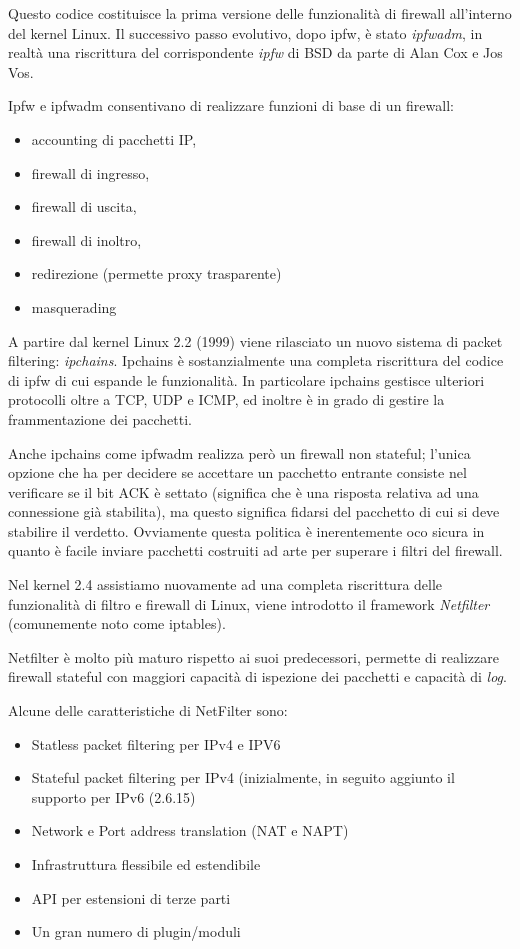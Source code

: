 Questo codice costituisce la prima versione delle funzionalità di firewall
all'interno del kernel Linux. Il successivo passo evolutivo, dopo ipfw, è
stato {\em ipfwadm}, in realtà una riscrittura del corrispondente {\em ipfw}
di BSD da parte di Alan Cox e Jos Vos.

Ipfw e ipfwadm consentivano di realizzare funzioni di base di un firewall:

\begin{itemize}
    \item accounting di pacchetti IP,
    \item firewall di ingresso,
    \item firewall di uscita,
    \item firewall di inoltro,
    \item redirezione (permette proxy trasparente)
    \item masquerading
\end{itemize}

A partire dal kernel Linux 2.2 (1999) viene rilasciato un nuovo sistema di packet
filtering: {\em ipchains}. Ipchains \`e sostanzialmente una completa
riscrittura del codice di ipfw di cui espande le funzionalità.  In particolare
ipchains gestisce ulteriori protocolli oltre a TCP, UDP e ICMP, ed inoltre è
in grado di gestire la frammentazione dei pacchetti.

Anche ipchains come ipfwadm realizza però un firewall non stateful; l'unica
opzione che ha per decidere se accettare un pacchetto entrante consiste nel
verificare se il bit ACK \`e settato (significa che è una risposta relativa ad
una connessione già stabilita), ma questo significa fidarsi del pacchetto di
cui si deve stabilire il verdetto.  Ovviamente questa politica è inerentemente
oco sicura in quanto è facile inviare pacchetti costruiti ad arte per
superare i filtri del firewall.

Nel kernel 2.4 assistiamo nuovamente ad una completa riscrittura delle
funzionalità di filtro e firewall di Linux, viene introdotto il framework {\em
Netfilter} (comunemente noto come iptables).

Netfilter è molto più maturo rispetto ai suoi predecessori, permette di
realizzare firewall stateful con maggiori capacità di ispezione dei pacchetti
e capacità di {\em log}.

Alcune delle caratteristiche di NetFilter sono:

\begin{itemize}
    \item Statless packet filtering per IPv4 e IPV6
    \item Stateful packet filtering per IPv4 (inizialmente, in seguito
        aggiunto il supporto per IPv6 (2.6.15)
    \item Network e Port address translation (NAT e NAPT)
    \item Infrastruttura flessibile ed estendibile
    \item API per estensioni di terze parti
    \item Un gran numero di plugin/moduli
\end{itemize}

